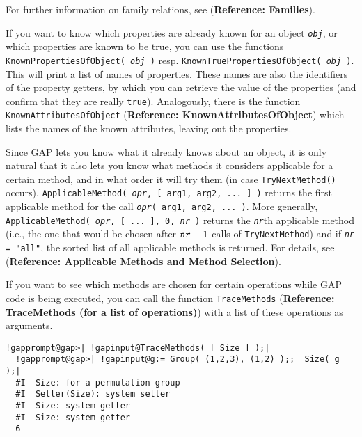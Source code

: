 \documentclass[a4paper,11pt]{report}
\begin{document}
{{ For further information on family relations, see  (\textbf{Reference: Families}). 

    If you want to know which properties are already known for an object \mbox{\texttt{\mdseries\slshape obj}}, or which properties are known to be true, you can use the functions \texttt{KnownPropertiesOfObject( \mbox{\texttt{\mdseries\slshape obj}} )} resp. \texttt{KnownTruePropertiesOfObject( \mbox{\texttt{\mdseries\slshape obj}} )}. This will print a list of names of properties. These names are also the
identifiers of the property getters, by which you can retrieve the value of
the properties (and confirm that they are really \texttt{true}). Analogously, there is the function \texttt{KnownAttributesOfObject} (\textbf{Reference: KnownAttributesOfObject}) which lists the names of the known attributes, leaving out the properties. 

  Since \textsf{GAP} lets you know what it already knows about an object, it is only natural that
it also lets you know what methods it considers applicable for a certain
method, and in what order it will try them (in case \texttt{TryNextMethod()} occurs). \texttt{ApplicableMethod( \mbox{\texttt{\mdseries\slshape opr}}, [ arg{\textunderscore}1, arg{\textunderscore}2, ... ] )} returns the first applicable method for the call \texttt{\mbox{\texttt{\mdseries\slshape opr}}( arg{\textunderscore}1, arg{\textunderscore}2, ... )}. More generally, \texttt{ApplicableMethod( \mbox{\texttt{\mdseries\slshape opr}}, [ ... ], 0, \mbox{\texttt{\mdseries\slshape nr}} )} returns the \mbox{\texttt{\mdseries\slshape nr}}th applicable method (i.e., the one that would be chosen after $\mbox{\texttt{\mdseries\slshape nr}}-1$ calls of \texttt{TryNextMethod}) and if \mbox{\texttt{\mdseries\slshape nr}}\texttt{ = "all"}, the sorted list of all applicable methods is returned. For details, see  (\textbf{Reference: Applicable Methods and Method Selection}). 

  If you want to see which methods are chosen for certain operations while \textsf{GAP} code is being executed, you can call the function \texttt{TraceMethods} (\textbf{Reference: TraceMethods (for a list of operations)}) with a list of these operations as arguments. 

 
\begin{Verbatim}[commandchars=!@|,fontsize=\small,frame=single,label=Example]
  !gapprompt@gap>| !gapinput@TraceMethods( [ Size ] );|
  !gapprompt@gap>| !gapinput@g:= Group( (1,2,3), (1,2) );;  Size( g );|
  #I  Size: for a permutation group
  #I  Setter(Size): system setter
  #I  Size: system getter
  #I  Size: system getter
  6
\end{Verbatim}
 

}}
\end{document}

